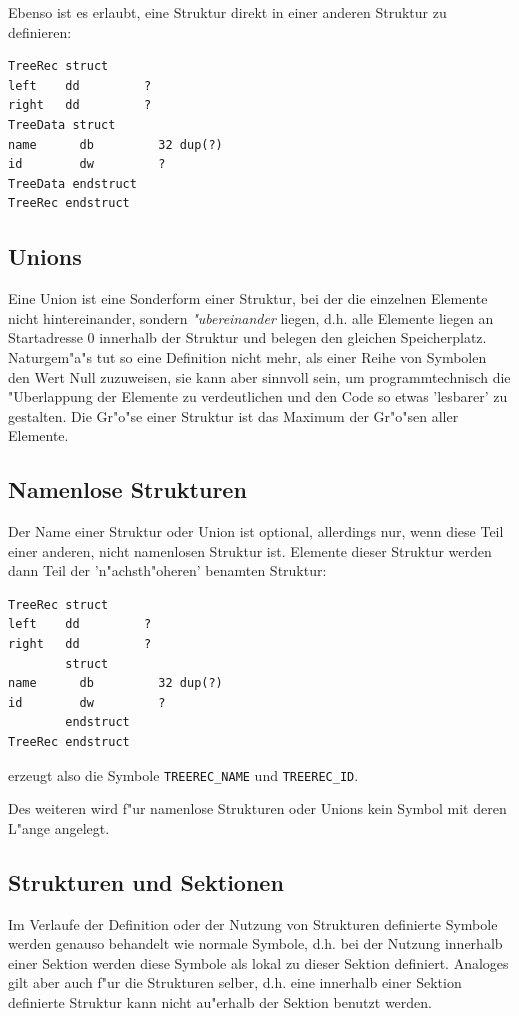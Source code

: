 \documentclass[12pt,a4paper,twoside]{report}
\begin{document}
Ebenso ist es erlaubt, eine Struktur direkt in einer anderen
Struktur zu definieren:
\begin{verbatim}
TreeRec struct
left    dd         ?
right   dd         ?
TreeData struct
name      db         32 dup(?)
id        dw         ?
TreeData endstruct
TreeRec endstruct
\end{verbatim}


\subsection{Unions}

Eine Union ist eine Sonderform einer Struktur, bei der die einzelnen
Elemente nicht hintereinander, sondern {\em "ubereinander} liegen, d.h.
alle Elemente liegen an Startadresse 0 innerhalb der Struktur und belegen
den gleichen Speicherplatz.  Naturgem"a"s tut so eine Definition nicht
mehr, als einer Reihe von Symbolen den Wert Null zuzuweisen, sie kann aber
sinnvoll sein, um programmtechnisch die "Uberlappung der Elemente zu
verdeutlichen und den Code so etwas 'lesbarer' zu gestalten.  Die Gr"o"se
einer Struktur ist das Maximum der Gr"o"sen aller Elemente.

\subsection{Namenlose Strukturen}

Der Name einer Struktur oder Union ist optional, allerdings nur, wenn
diese Teil einer anderen, nicht namenlosen Struktur ist.  Elemente
dieser Struktur werden dann Teil der 'n"achsth"oheren' benamten
Struktur:
\begin{verbatim}
TreeRec struct
left    dd         ?
right   dd         ?
        struct
name      db         32 dup(?)
id        dw         ?
        endstruct
TreeRec endstruct
\end{verbatim}
erzeugt also die Symbole {\tt TREEREC\_NAME} und {\tt TREEREC\_ID}.

Des weiteren wird f"ur namenlose Strukturen oder Unions kein Symbol
mit deren L"ange angelegt.

\subsection{Strukturen und Sektionen}

Im Verlaufe der Definition oder der Nutzung von Strukturen definierte
Symbole werden genauso behandelt wie normale Symbole, d.h. bei der Nutzung
innerhalb einer Sektion werden diese Symbole als lokal zu dieser Sektion
definiert.  Analoges gilt aber auch f"ur die Strukturen selber, d.h. eine
innerhalb einer Sektion definierte Struktur kann nicht au"erhalb der
Sektion benutzt werden.
\end{document}
